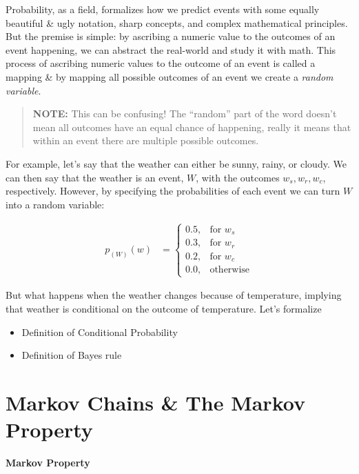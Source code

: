 \documentclass[
]{book}
\providecommand{\tightlist}{%
  \setlength{\itemsep}{0pt}\setlength{\parskip}{0pt}}
\begin{document}
Probability, as a field, formalizes how we predict events with some equally beautiful \& ugly notation, sharp concepts, and complex mathematical principles.
But the premise is simple: by ascribing a numeric value to the outcomes of an event happening, we can abstract the real-world and study it with math. This process of ascribing numeric values to the outcome of an event is called a mapping \& by mapping all possible outcomes of an event we create a \emph{random variable}.

\begin{quote}
\textbf{NOTE:} This can be confusing! The ``random'' part of the word doesn't mean all outcomes have an equal chance of happening, really it means that within an event there are multiple possible outcomes.
\end{quote}

For example, let's say that the weather can either be sunny, rainy, or cloudy. We can then say that the weather is an event, \(W\), with the outcomes \(w_s,w_r,w_c\), respectively. However, by specifying the probabilities of each event we can turn \(W\) into a random variable:

\[\begin{aligned} 
p_{(W)}(w)  &= \begin{cases}
    0.5, & \text{for } w_s \\
    0.3, & \text{for } w_r \\
    0.2, & \text{for } w_c \\
    0.0, & \text{otherwise}
\end{cases}
\end{aligned}\]

But what happens when the weather changes because of temperature, implying that weather is conditional on the outcome of temperature. Let's formalize

\begin{itemize}
\tightlist
\item
  Definition of Conditional Probability
\item
  Definition of Bayes rule
\end{itemize}

\hypertarget{markov-chains-the-markov-property}{%
\section{Markov Chains \& The Markov Property}\label{markov-chains-the-markov-property}}

\textbf{Markov Property}
\end{document}

